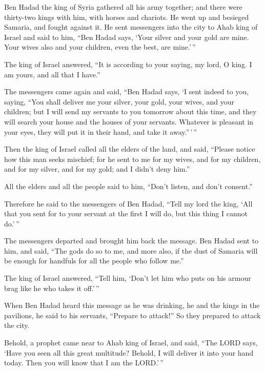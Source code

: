  Ben Hadad the king of Syria gathered all his army together;
and there were thirty-two kings with him, with horses and chariots. He
went up and besieged Samaria, and fought against it.  He
sent messengers into the city to Ahab king of Israel and said to him,
``Ben Hadad says,  `Your silver and your gold are mine. Your
wives also and your children, even the best, are mine.'\,''

 The king of Israel answered, ``It is according to your
saying, my lord, O king. I am yours, and all that I have.''

 The messengers came again and said, ``Ben Hadad says, `I
sent indeed to you, saying, ``You shall deliver me your silver, your
gold, your wives, and your children;  but I will send my
servants to you tomorrow about this time, and they will search your
house and the houses of your servants. Whatever is pleasant in your
eyes, they will put it in their hand, and take it away.''\,'\,''

 Then the king of Israel called all the elders of the land,
and said, ``Please notice how this man seeks mischief; for he sent to me
for my wives, and for my children, and for my silver, and for my gold;
and I didn't deny him.''

 All the elders and all the people said to him, ``Don't
listen, and don't consent.''

 Therefore he said to the messengers of Ben Hadad, ``Tell my
lord the king, `All that you sent for to your servant at the first I
will do, but this thing I cannot do.'\,''

The messengers departed and brought him back the message. 
Ben Hadad sent to him, and said, ``The gods do so to me, and more also,
if the dust of Samaria will be enough for handfuls for all the people
who follow me.''

 The king of Israel answered, ``Tell him, `Don't let him
who puts on his armour brag like he who takes it off.'\,''

 When Ben Hadad heard this message as he was drinking, he
and the kings in the pavilions, he said to his servants, ``Prepare to
attack!'' So they prepared to attack the city.

 Behold, a prophet came near to Ahab king of Israel, and
said, ``The LORD says, `Have you seen all this great multitude? Behold,
I will deliver it into your hand today. Then you will know that I am the
LORD.'\,''

